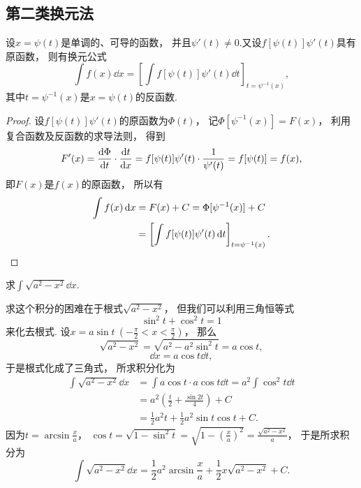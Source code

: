 \subsection{第二类换元法}
\begin{theorem}
设\(x = \psi(t)\)是单调的、可导的函数，
并且\(\psi'(t) \neq 0\).又设\(f[\psi(t)] \psi'(t)\)具有原函数，
则有换元公式\[
	\int f(x) \dd{x}
	= \left[ \int f[\psi(t)] \psi'(t) \dd{t} \right]_{t=\psi^{-1}(x)},
\]
其中\(t=\psi^{-1}(x)\)是\(x=\psi(t)\)的反函数.
\begin{proof}
设\(f[\psi(t)] \psi'(t)\)的原函数为\(\Phi(t)\)，
记\(\Phi[\psi^{-1}(x)] = F(x)\)，
利用复合函数及反函数的求导法则，
得到\[
	F'(x) = \dv{\Phi}{t} \cdot \dv{t}{x}
	= f[\psi(t)] \psi'(t) \cdot \frac{1}{\psi'(t)}
	= f[\psi(t)] = f(x),
\]
即\(F(x)\)是\(f(x)\)的原函数，
所以有\begin{align*}
	\int f(x) \dd{x} &= F(x) + C
	= \Phi[\psi^{-1}(x)] + C \\
	&= \left[ \int f[\psi(t)] \psi'(t) \dd{t} \right]_{t=\psi^{-1}(x)}.
	\qedhere
\end{align*}
\end{proof}
\end{theorem}

\begin{example}
求\(\int \sqrt{a^2 - x^2} \dd{x}\).
\begin{solution}
求这个积分的困难在于根式\(\sqrt{a^2-x^2}\)，
但我们可以利用三角恒等式\[
	\sin^2t+\cos^2t=1
\]来化去根式.
设\(x = a \sin t\ (-\frac\pi2 < x < \frac\pi2)\)，
那么\[
	\sqrt{a^2 - x^2}
	= \sqrt{a^2 - a^2 \sin^2 t}
	= a \cos t,
\]\[
	\dd{x}
	= a \cos t \dd{t},
\]
于是根式化成了三角式，
所求积分化为\begin{align*}
	\int \sqrt{a^2 - x^2} \dd{x}
	&= \int a \cos t \cdot a \cos t \dd{t}
	= a^2 \int \cos^2 t \dd{t} \\
	&= a^2 \left( \frac{t}{2} + \frac{\sin 2t}{4} \right) + C \\
	&= \frac{1}{2} a^2 t + \frac{1}{2} a^2 \sin t \cos t + C.
\end{align*}
因为\(t = \arcsin\frac{x}{a}\)，
\(\cos t
= \sqrt{1-\sin^2 t}
= \sqrt{1-\left(\frac{x}{a}\right)^2}
= \frac{\sqrt{a^2-x^2}}{a}\)，
于是所求积分为\[
	\int \sqrt{a^2 - x^2} \dd{x}
	= \frac{1}{2} a^2 \arcsin\frac{x}{a} + \frac{1}{2} x \sqrt{a^2 - x^2} + C.
\]
\end{solution}
\end{example}


